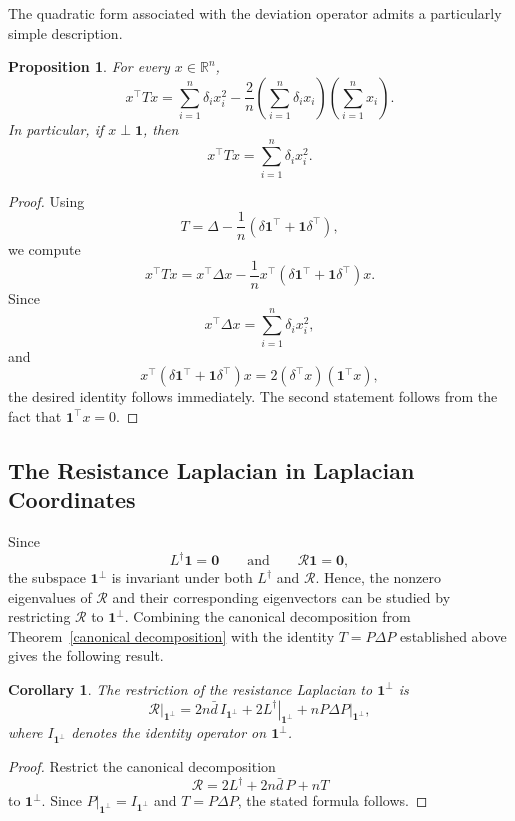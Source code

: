 \documentclass[12pt,a4paper]{amsart}
\newtheorem{corollary}[theorem]{Corollary}
\newtheorem{proposition}[theorem]{Proposition}
\theoremstyle{remark}
\theoremstyle{definition}
\newcommand{\Rs}{\mathcal{R}}
\newcommand{\1}{\mathbf{1}}
\newcommand{\0}{\mathbf{0}}
\begin{document}
The quadratic form associated with the deviation operator admits a particularly simple description.

\begin{proposition}
For every $x\in\mathbb{R}^n$,
\[
x^{\top}Tx
=
\sum_{i=1}^{n}\delta_i x_i^2
-
\frac{2}{n}
\left(\sum_{i=1}^{n}\delta_i x_i\right)
\left(\sum_{i=1}^{n}x_i\right).
\]
In particular, if $x\perp\mathbf{1}$, then
\[
x^{\top}Tx
=
\sum_{i=1}^{n}\delta_i x_i^2.
\]
\end{proposition}

\begin{proof}
Using
\[
T=\Delta-\frac1n(\delta\mathbf{1}^{\top}+\mathbf{1}\delta^{\top}),
\]
we compute
\[
x^{\top}Tx
=
x^{\top}\Delta x
-
\frac1n
x^{\top}
(\delta\mathbf{1}^{\top}+\mathbf{1}\delta^{\top})
x.
\]
Since
\[
x^{\top}\Delta x=\sum_{i=1}^{n}\delta_i x_i^2,
\]
and
\[
x^{\top}
(\delta\mathbf{1}^{\top}+\mathbf{1}\delta^{\top})
x
=
2(\delta^{\top}x)(\mathbf{1}^{\top}x),
\]
the desired identity follows immediately.
The second statement follows from the fact that
$\mathbf{1}^{\top}x=0$.
\end{proof}




\subsection{The Resistance Laplacian in Laplacian Coordinates}

Since
\[
L^\dagger\mathbf{1}=\mathbf{0}
\qquad\text{and}\qquad
\Rs\mathbf{1}=\mathbf{0},
\]
the subspace $\mathbf{1}^{\perp}$ is invariant under both
$L^\dagger$ and $\Rs$. Hence, the nonzero eigenvalues of $\Rs$ and
their corresponding eigenvectors can be studied by restricting $\Rs$
to $\mathbf{1}^{\perp}$. Combining the canonical decomposition from
Theorem~\ref{canonical decomposition} with the identity
$T=P\Delta P$ established above gives the following result.

\begin{corollary}\label{thm:restriction}
The restriction of the resistance Laplacian to
$\mathbf{1}^{\perp}$ is
\[
\left.\Rs\right|_{\mathbf{1}^{\perp}}
=
2n\bar d\,I_{\mathbf{1}^{\perp}}
+
2\left.L^\dagger\right|_{\mathbf{1}^{\perp}}
+
n\left.P\Delta P\right|_{\mathbf{1}^{\perp}},
\]
where $I_{\mathbf{1}^{\perp}}$ denotes the identity operator on
$\mathbf{1}^{\perp}$.
\end{corollary}

\begin{proof}
Restrict the canonical decomposition
\[
\Rs=2L^\dagger+2n\bar d\,P+nT
\]
to $\mathbf{1}^{\perp}$. Since
$\left.P\right|_{\mathbf{1}^{\perp}}=I_{\mathbf{1}^{\perp}}$ and
$T=P\Delta P$, the stated formula follows.
\end{proof}
\end{document}
